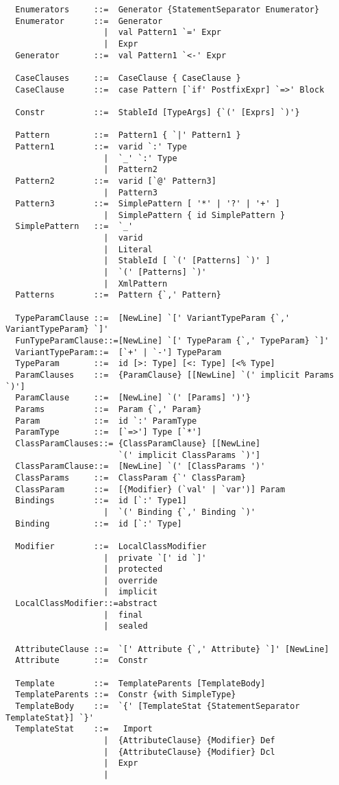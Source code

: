 \begin{lstlisting}
  Enumerators     ::=  Generator {StatementSeparator Enumerator}
  Enumerator      ::=  Generator
                    |  val Pattern1 `=' Expr
                    |  Expr
  Generator       ::=  val Pattern1 `<-' Expr

  CaseClauses     ::=  CaseClause { CaseClause }
  CaseClause      ::=  case Pattern [`if' PostfixExpr] `=>' Block 

  Constr          ::=  StableId [TypeArgs] {`(' [Exprs] `)'}

  Pattern         ::=  Pattern1 { `|' Pattern1 }
  Pattern1        ::=  varid `:' Type
                    |  `_' `:' Type
                    |  Pattern2
  Pattern2        ::=  varid [`@' Pattern3]
                    |  Pattern3
  Pattern3        ::=  SimplePattern [ '*' | '?' | '+' ]
                    |  SimplePattern { id SimplePattern }
  SimplePattern   ::=  `_'
                    |  varid
                    |  Literal
                    |  StableId [ `(' [Patterns] `)' ]
                    |  `(' [Patterns] `)'
                    |  XmlPattern
  Patterns        ::=  Pattern {`,' Pattern}

  TypeParamClause ::=  [NewLine] `[' VariantTypeParam {`,' VariantTypeParam} `]'
  FunTypeParamClause::=[NewLine] `[' TypeParam {`,' TypeParam} `]'
  VariantTypeParam::=  [`+' | `-'] TypeParam
  TypeParam       ::=  id [>: Type] [<: Type] [<% Type]
  ParamClauses    ::=  {ParamClause} [[NewLine] `(' implicit Params `)']
  ParamClause     ::=  [NewLine] `(' [Params] ')'} 
  Params          ::=  Param {`,' Param}
  Param           ::=  id `:' ParamType
  ParamType       ::=  [`=>'] Type [`*']
  ClassParamClauses::= {ClassParamClause} [[NewLine] 
                       `(' implicit ClassParams `)']
  ClassParamClause::=  [NewLine] `(' [ClassParams ')'
  ClassParams     ::=  ClassParam {`' ClassParam}
  ClassParam      ::=  [{Modifier} (`val' | `var')] Param
  Bindings        ::=  id [`:' Type1]
                    |  `(' Binding {`,' Binding `)'
  Binding         ::=  id [`:' Type]

  Modifier        ::=  LocalClassModifier
                    |  private `[' id `]'
                    |  protected
                    |  override 
                    |  implicit
  LocalClassModifier::=abstract
                    |  final
                    |  sealed

  AttributeClause ::=  `[' Attribute {`,' Attribute} `]' [NewLine]
  Attribute       ::=  Constr

  Template        ::=  TemplateParents [TemplateBody]
  TemplateParents ::=  Constr {with SimpleType}
  TemplateBody    ::=  `{' [TemplateStat {StatementSeparator TemplateStat}] `}'
  TemplateStat    ::=   Import
                    |  {AttributeClause} {Modifier} Def
                    |  {AttributeClause} {Modifier} Dcl
                    |  Expr
                    |


\end{lstlisting}
